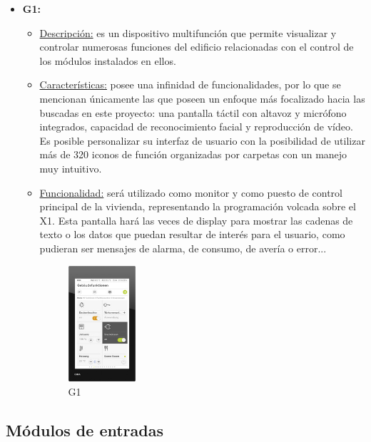 \begin{itemize}
\item \textbf{G1:} 
	\begin{itemize}
	\item\underline{Descripción:} es un dispositivo multifunción que permite visualizar y controlar numerosas funciones del edificio relacionadas con el control de los módulos instalados en ellos.
	\item \underline{Características:} posee una infinidad de funcionalidades, por lo que se mencionan únicamente las que poseen un enfoque más focalizado hacia las buscadas en este proyecto: una pantalla táctil con altavoz y micrófono integrados, capacidad de reconocimiento facial y reproducción de vídeo. Es posible personalizar su interfaz de usuario con la posibilidad de utilizar más de 320 iconos de función organizadas por carpetas con un manejo muy intuitivo. 
	\item \underline{Funcionalidad:} será utilizado como monitor y como puesto de control principal de la vivienda, representando la programación volcada sobre el X1. Esta pantalla hará las veces de display para mostrar las cadenas de texto o los datos que puedan resultar de interés para el usuario, como pudieran ser mensajes de alarma, de consumo, de avería o error... 
	\begin{figure}[H]
	\centering
	\includegraphics[width=0.25\textwidth]{figures/g1.png}   
	\caption{G1}
	\label{fig:g1}
	\end{figure}
	\end{itemize} 
\end{itemize} 

\subsection{Módulos de entradas}

